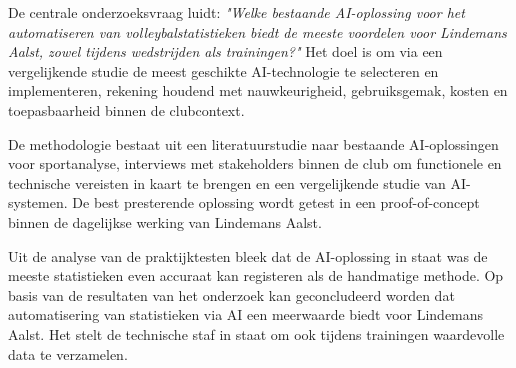 De centrale onderzoeksvraag luidt: \textit{"Welke bestaande AI-oplossing voor het automatiseren van volleybalstatistieken biedt de meeste voordelen voor Lindemans Aalst, zowel tijdens wedstrijden als trainingen?"} Het doel is om via een vergelijkende studie de meest geschikte AI-technologie te selecteren en implementeren, rekening houdend met nauwkeurigheid, gebruiksgemak, kosten en toepasbaarheid binnen de clubcontext.

De methodologie bestaat uit een literatuurstudie naar bestaande AI-oplossingen voor sportanalyse, interviews met stakeholders binnen de club om functionele en technische vereisten in kaart te brengen en een vergelijkende studie van AI-systemen. De best presterende oplossing wordt getest in een proof-of-concept binnen de dagelijkse werking van Lindemans Aalst.

Uit de analyse van de praktijktesten bleek dat de AI-oplossing in staat was de meeste statistieken even accuraat kan registeren als de handmatige methode. Op basis van de resultaten van het onderzoek kan geconcludeerd worden dat automatisering van statistieken via AI een meerwaarde biedt voor Lindemans Aalst. Het stelt de technische staf in staat om ook tijdens trainingen waardevolle data te verzamelen. 
